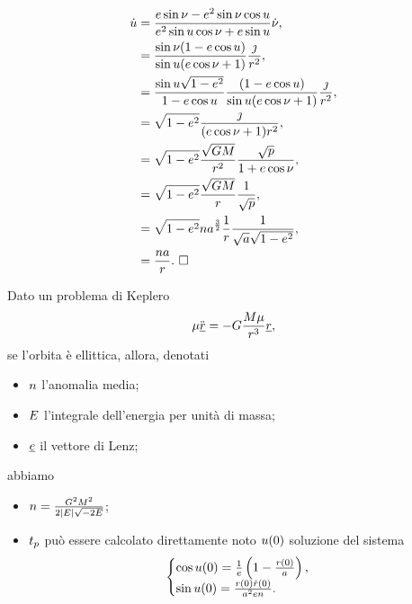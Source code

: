 \begin{align*}
  \dot{u} &=
    \frac{e \sin{\nu}
      - e^2 \sin{\nu} \cos{u}}
    {e^2 \sin{u} \cos{\nu}
      + e \sin{u}} \dot{\nu},\\
  &=
    \frac{\sin{\nu} (1 - e \cos{u})}
      {\sin{u} (e \cos{\nu} + 1)}
    \frac{\jmath}{r^2},\\
  &=
    \frac{\sin{u} \sqrt{1 - e^2}}
      {1 - e \cos{u}}
    \frac{(1 - e \cos{u})}
      {\sin{u} (e \cos{\nu} + 1)}
    \frac{\jmath}{r^2},\\
  &=
    \sqrt{1 - e^2}
    \frac{\jmath}
    {(e \cos{\nu} + 1) r^2},\\
  &=
    \sqrt{1 - e^2}
    \frac{\sqrt{G M}}{r^2}
    \frac{\sqrt{p}}
      {1 + e \cos{\nu}},\\
  &=
    \sqrt{1 - e^2}
    \frac{\sqrt{G M}}{r}
    \frac{1}{\sqrt{p}},\\
  &=
    \sqrt{1 - e^2}
    n a^{\frac{3}{2}}
    \frac{1}{r}
    \frac{1}{\sqrt{a}\sqrt{1 - e^2}},\\
  &=
    \frac{n a}{r}.\text{ $\square$}
\end{align*}
\begin{Theorem}
	Dato un problema di Keplero
	\[
		\mu \ddot{\underline{r}}
    = - G \frac{M\mu}{r^3}\underline{r},
	\]
  se l'orbita \`e ellittica, allora, denotati
  \begin{itemize}
    \item $n$ l'anomalia media;
    \item $E$ l'integrale dell'energia per unit\`a di
      massa;
    \item $\underline{e}$ il vettore di Lenz;
  \end{itemize}
  abbiamo
  \begin{itemize}
    \item $n = \frac{G^2M^2}
    {2 \left \lvert E \right \rvert\sqrt{- 2 E}}$;
    \item ${t_p}$ pu\`o essere calcolato direttamente
      noto $u(0)$ soluzione del sistema
      \[
        \begin{cases}
          \cos{u(0)} = \frac{1}{e}
            \left ( 1 - \frac{r(0)}{a} \right ),\\
          \sin{u(0)} = \frac{r(0)\dot{r}(0)}
            {a^2 e n}.
        \end{cases}
      \]
  \end{itemize}
\end{Theorem}
